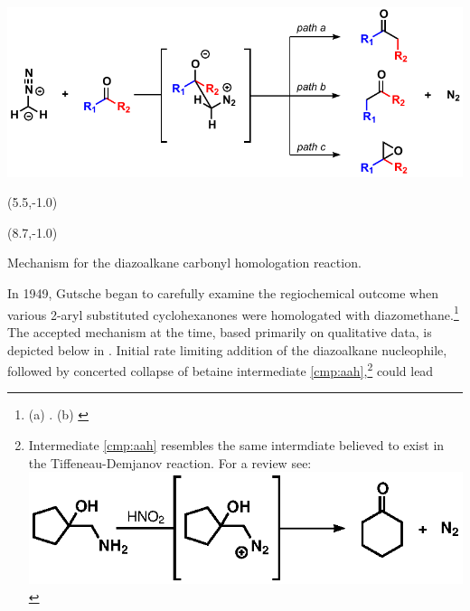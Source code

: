 \begin{Scheme}[b]
  \centering
  \includegraphics[scale=0.8]{chp_diazobkg/images/mechanism}
  \begin{textblock}{1}(5.5,-1.0)  \end{textblock}
  \begin{textblock}{1}(8.7,-1.0)  \end{textblock}
  \caption{Mechanism for the diazoalkane carbonyl homologation
  reaction.}
  \label{sch:mechanism}
\end{Scheme}
In 1949, Gutsche began to carefully examine the regiochemical outcome when
various 2-aryl substituted cyclohexanones were homologated with
diazomethane.\footnote{(a)
. (b)  \label{ref:gutschetwo}} The accepted mechanism at the time,
based primarily on qualitative data, is depicted below in
. Initial rate limiting addition of the diazoalkane
nucleophile, followed by concerted collapse of betaine intermediate
\ref{cmp:aah},\footnote{Intermediate \ref{cmp:aah} resembles the same
intermdiate believed to exist in the Tiffeneau-Demjanov reaction. For a review see: \\
\includegraphics[scale=0.7]{chp_diazobkg/images/tiffeneaudemjanov}} could lead
